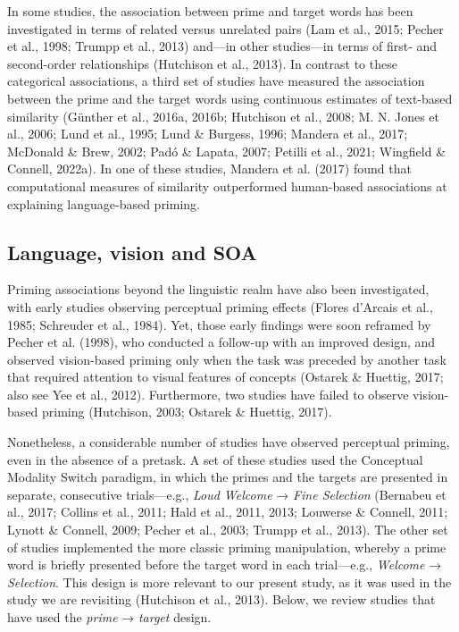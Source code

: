 \documentclass[
  12pt,
  man,floatsintext]{apa7}
\begin{document}
In some studies, the association between prime and target words has been investigated in terms of related versus unrelated pairs (Lam et al., 2015; Pecher et al., 1998; Trumpp et al., 2013) and---in other studies---in terms of first- and second-order relationships (Hutchison et al., 2013). In contrast to these categorical associations, a third set of studies have measured the association between the prime and the target words using continuous estimates of text-based similarity (Günther et al., 2016a, 2016b; Hutchison et al., 2008; M. N. Jones et al., 2006; Lund et al., 1995; Lund \& Burgess, 1996; Mandera et al., 2017; McDonald \& Brew, 2002; Padó \& Lapata, 2007; Petilli et al., 2021; Wingfield \& Connell, 2022a). In one of these studies, Mandera et al. (2017) found that computational measures of similarity outperformed human-based associations at explaining language-based priming.

\hypertarget{language-vision-and-soa}{%
\subsection{Language, vision and SOA}\label{language-vision-and-soa}}

Priming associations beyond the linguistic realm have also been investigated, with early studies observing perceptual priming effects (Flores d'Arcais et al., 1985; Schreuder et al., 1984). Yet, those early findings were soon reframed by Pecher et al. (1998), who conducted a follow-up with an improved design, and observed vision-based priming only when the task was preceded by another task that required attention to visual features of concepts (Ostarek \& Huettig, 2017; also see Yee et al., 2012). Furthermore, two studies have failed to observe vision-based priming (Hutchison, 2003; Ostarek \& Huettig, 2017).

Nonetheless, a considerable number of studies have observed perceptual priming, even in the absence of a pretask. A set of these studies used the Conceptual Modality Switch paradigm, in which the primes and the targets are presented in separate, consecutive trials---e.g., \emph{Loud Welcome} → \emph{Fine Selection} (Bernabeu et al., 2017; Collins et al., 2011; Hald et al., 2011, 2013; Louwerse \& Connell, 2011; Lynott \& Connell, 2009; Pecher et al., 2003; Trumpp et al., 2013). The other set of studies implemented the more classic priming manipulation, whereby a prime word is briefly presented before the target word in each trial---e.g., \emph{Welcome} → \emph{Selection}. This design is more relevant to our present study, as it was used in the study we are revisiting (Hutchison et al., 2013). Below, we review studies that have used the \emph{prime} → \emph{target} design.
\end{document}
